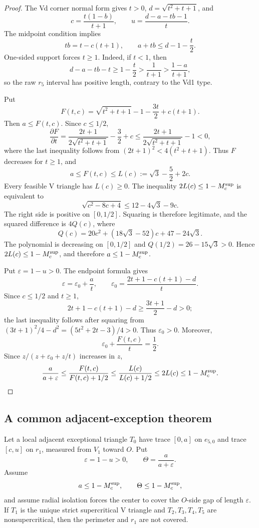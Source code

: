 \begin{proof}
The Vd corner normal form gives $t>0$, $d=\sqrt{t^2+t+1}$, and
\[
 c=\frac{t(1-b)}{t+1},
 \qquad
 u=\frac{d-a-tb-1}{t}.
\]
The midpoint condition implies
\[
 tb=t-c(t+1),
 \qquad
 a+tb\le d-1-\frac t2.
\]
One-sided support forces $t\ge1$.  Indeed, if $t<1$, then
\[
 d-a-tb-t\ge1-\frac t2>\frac1{t+1}>\frac{1-a}{t+1},
\]
so the raw $r_5$ interval has positive length, contrary to the Vd1 type.

Put
\[
 F(t,c)=\sqrt{t^2+t+1}-1-\frac{3t}{2}+c(t+1).
\]
Then $a\le F(t,c)$.  Since $c\le1/2$,
\[
 \frac{\partial F}{\partial t}
 =\frac{2t+1}{2\sqrt{t^2+t+1}}-\frac32+c
 \le\frac{2t+1}{2\sqrt{t^2+t+1}}-1<0,
\]
where the last inequality follows from
$(2t+1)^2<4(t^2+t+1)$.  Thus $F$ decreases for $t\ge1$, and
\[
 a\le F(t,c)\le L(c):=\sqrt3-\frac52+2c.
\]
Every feasible V triangle has $L(c)\ge0$.  The inequality
$2L(c)\le 1-M_c^{\rm sup}$ is equivalent to
\[
 \sqrt{c^2-8c+4}\le12-4\sqrt3-9c.
\]
The right side is positive on $[0,1/2]$.  Squaring is therefore
legitimate, and the squared difference is $4Q(c)$, where
\[
 Q(c)=20c^2+(18\sqrt3-52)c+47-24\sqrt3.
\]
The polynomial is decreasing on $[0,1/2]$ and
$Q(1/2)=26-15\sqrt3>0$.  Hence $2L(c)\le 1-M_c^{\rm sup}$,
and therefore $a\le 1-M_c^{\rm sup}$.

Put $\varepsilon=1-u>0$.  The endpoint formula gives
\[
 \varepsilon=\varepsilon_0+\frac at,
 \qquad
 \varepsilon_0=\frac{2t+1-c(t+1)-d}{t}.
\]
Since $c\le1/2$ and $t\ge1$,
\[
 2t+1-c(t+1)-d\ge\frac{3t+1}{2}-d>0;
\]
the last inequality follows after squaring from
$(3t+1)^2/4-d^2=(5t^2+2t-3)/4>0$.  Thus
$\varepsilon_0>0$.  Moreover,
\[
 \varepsilon_0+\frac{F(t,c)}t=\frac12.
\]
Since $z/(z+\varepsilon_0+z/t)$ increases in $z$,
\[
 \frac{a}{a+\varepsilon}
 \le\frac{F(t,c)}{F(t,c)+1/2}
 \le\frac{L(c)}{L(c)+1/2}
 \le2L(c)
 \le 1-M_c^{\rm sup}.
\]
\end{proof}

\subsection{A common adjacent-exception theorem}

\begin{lemma}
\label{lem:signed-adjacent-rescuer}
Let a local adjacent exceptional triangle $T_0$ have trace $[0,a]$ on $e_{5,0}$ and
trace $[c,u]$ on $r_1$, measured from $V_1$ toward $O$.  Put
\[
 \varepsilon=1-u>0,
 \qquad
 \Theta=\frac{a}{a+\varepsilon}.
\]
Assume
\begin{equation}
 a\le 1-M_c^{\rm sup},
 \qquad
 \Theta\le 1-M_c^{\rm sup},
 \label{eq:signed-rescuer-local}
\end{equation}
and assume radial isolation forces the center to cover the $O$-side gap of
length $\varepsilon$.  If $T_1$ is the unique strict supercritical V triangle and
$T_2,T_3,T_4,T_5$ are nonsupercritical, then the perimeter and $r_1$ are not
covered.
\end{lemma}

